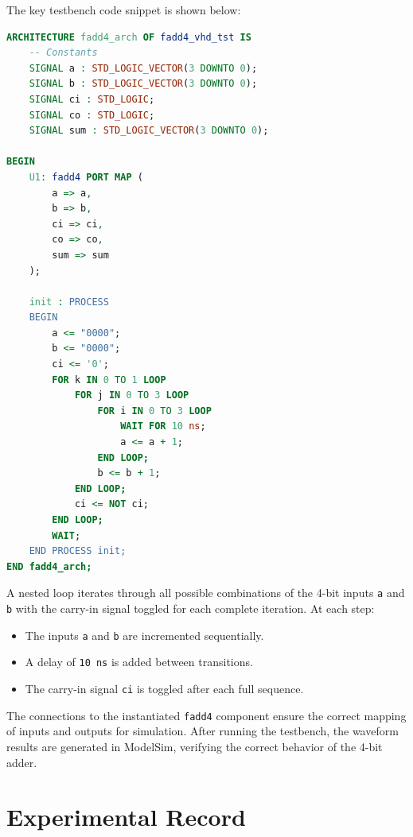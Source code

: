 \documentclass[12pt,a4paper,oneside]{ctexart}
\begin{document}
The key testbench code snippet is shown below:

\begin{lstlisting}[language=VHDL, caption=Testbench Code for 4-bit Adder Simulation]
ARCHITECTURE fadd4_arch OF fadd4_vhd_tst IS
    -- Constants
    SIGNAL a : STD_LOGIC_VECTOR(3 DOWNTO 0);
    SIGNAL b : STD_LOGIC_VECTOR(3 DOWNTO 0);
    SIGNAL ci : STD_LOGIC;
    SIGNAL co : STD_LOGIC;
    SIGNAL sum : STD_LOGIC_VECTOR(3 DOWNTO 0);

BEGIN
    U1: fadd4 PORT MAP (
        a => a,
        b => b,
        ci => ci,
        co => co,
        sum => sum
    );

    init : PROCESS
    BEGIN
        a <= "0000";
        b <= "0000";
        ci <= '0';
        FOR k IN 0 TO 1 LOOP
            FOR j IN 0 TO 3 LOOP
                FOR i IN 0 TO 3 LOOP
                    WAIT FOR 10 ns;
                    a <= a + 1;
                END LOOP;
                b <= b + 1;
            END LOOP;
            ci <= NOT ci;
        END LOOP;
        WAIT;
    END PROCESS init;
END fadd4_arch;
\end{lstlisting}

A nested loop iterates through all possible combinations of the 4-bit inputs \texttt{a} and \texttt{b} with the carry-in signal toggled for each complete iteration. At each step:
\begin{itemize}
    \item The inputs \texttt{a} and \texttt{b} are incremented sequentially.
    \item A delay of \texttt{10 ns} is added between transitions.
    \item The carry-in signal \texttt{ci} is toggled after each full sequence.
\end{itemize}

The connections to the instantiated \texttt{fadd4} component ensure the correct mapping of inputs and outputs for simulation. After running the testbench, the waveform results are generated in ModelSim, verifying the correct behavior of the 4-bit adder.

\section{Experimental Record}
\end{document}
